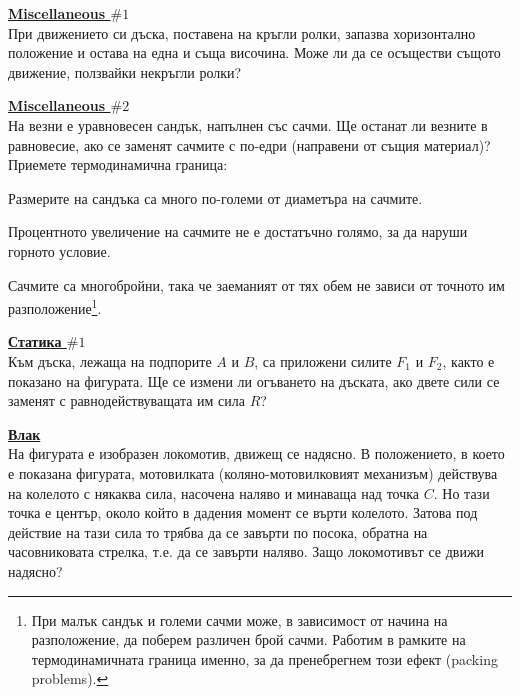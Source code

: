 \documentclass[a4paper]{article}
\begin{document}
	\ProblemBG %
	\textbf{\underline{Miscellaneous $\# 1$}}
	\vspace{0.2em}
	\\
	При движението си дъска, поставена на кръгли ролки, запазва хоризонтално положение и остава на една и съща височина. Може ли да се осъществи същото движение, ползвайки некръгли ролки?
	
	\ProblemBG %
	\textbf{\underline{Miscellaneous $\# 2$}}
	\vspace{0.2em}
	\\
	На везни е уравновесен сандък, напълнен със сачми. Ще останат ли везните в равновесие, ако се заменят сачмите с по-едри (направени от същия материал)? Приемете термодинамична граница:
	\begin{description}[leftmargin=!, labelwidth=\widthof{$\rightarrow$}]
		\item[$\rightarrow$] Размерите на сандъка са много по-големи от диаметъра на сачмите.
		\item[$\rightarrow$] Процентното увеличение на сачмите не е достатъчно голямо, за да наруши горното условие.
		\item[$\rightarrow$] Сачмите са многобройни, така че заеманият от тях обем не зависи от точното им разположение\footnote{При малък сандък и големи сачми може, в зависимост от начина на разположение, да поберем различен брой сачми. Работим в рамките на термодинамичната граница именно, за да пренебрегнем този ефект (packing problems).}.
	\end{description}
	
	\ProblemBG %
	\textbf{\underline{Статика $\# 1$}}
	\vspace{0.2em}
	\\
	Към дъска, лежаща на подпорите $A$ и $B$, са приложени силите $F_1$ и $F_2$, както е показано на фигурата. Ще се измени ли огъването на дъската, ако двете сили се заменят с равнодействуващата им сила $R$?
	\begin{figure}[H]
		\centering
		
	\end{figure}
	
	\ProblemBG %
	\textbf{\underline{Влак}}
	\vspace{0.2em}
	\\
	На фигурата е изобразен локомотив, движещ се надясно. В положението, в което е показана фигурата, мотовилката (коляно-мотовилковият механизъм) действува на колелото с някаква сила, насочена наляво и минаваща над точка $C$. Но тази точка е център, около който в дадения момент се върти колелото. Затова под действие на тази сила то трябва да се завърти по посока, обратна на часовниковата стрелка, т.е. да се завърти наляво. Защо локомотивът се движи надясно?
	\begin{figure}[H]
		\centering
		
	\end{figure}
	
\end{document}
